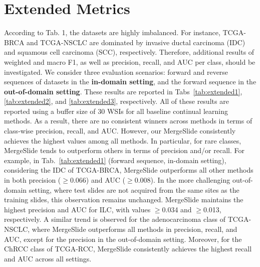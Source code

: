 \documentclass[10pt,twocolumn,letterpaper]{article}
\begin{document}
\section{Extended Metrics}\label{sec:extended} {According to Tab. 1, the datasets are highly imbalanced. For instance, TCGA-BRCA and TCGA-NSCLC are dominated by invasive ductal carcinoma (IDC) and squamous cell carcinoma (SCC), respectively. Therefore, additional results of weighted and macro F1, as well as precision, recall, and AUC per class, should be investigated. We consider three evaluation scenarios: forward and reverse sequences of datasets in the \textbf{in-domain setting}, and the forward sequence in the \textbf{out-of-domain setting}. These results are reported in Tabs~\ref{tab:extended1}, \ref{tab:extended2}, and \ref{tab:extended3}, respectively. All of these results are reported using a buffer size of 30 WSIs for all baseline continual learning methods. As a result, there are no consistent winners across methods in terms of class-wise precision, recall, and AUC. However, our MergeSlide consistently achieves the highest values among all methods. In particular, for rare classes, MergeSlide tends to outperform others in terms of precision and/or recall. For example, in Tab.~\ref{tab:extended1} (forward sequence, in-domain setting), considering the IDC of TCGA-BRCA, MergeSlide outperforms all other methods in both precision ($\geq$0.066) and AUC ($\geq$0.008). In the more challenging out-of-domain setting, where test slides are not acquired from the same sites as the training slides, this observation remains unchanged. MergeSlide maintains the highest precision and AUC for ILC, with values $\geq$0.034 and $\geq$0.013, respectively. A similar trend is observed for the adenocarcinoma class of TCGA-NSCLC, where MergeSlide outperforms all methods in precision, recall, and AUC, except for the precision in the out-of-domain setting. Moreover, for the ChRCC class of TCGA-RCC, MergeSlide consistently achieves the highest recall and AUC across all settings.}
\end{document}
